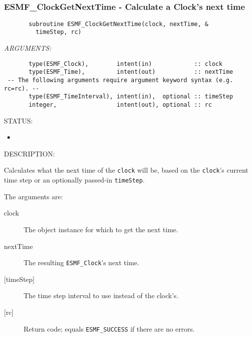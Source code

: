  
\mbox{}\hrulefill\ 
 
\subsubsection [ESMF\_ClockGetNextTime] {ESMF\_ClockGetNextTime - Calculate a Clock's next time}


 
\begin{verbatim}       subroutine ESMF_ClockGetNextTime(clock, nextTime, &
         timeStep, rc)
 \end{verbatim}{\em ARGUMENTS:}
\begin{verbatim}       type(ESMF_Clock),        intent(in)            :: clock
       type(ESMF_Time),         intent(out)           :: nextTime
 -- The following arguments require argument keyword syntax (e.g. rc=rc). --
       type(ESMF_TimeInterval), intent(in),  optional :: timeStep
       integer,                 intent(out), optional :: rc
 \end{verbatim}
{\sf STATUS:}
   \begin{itemize}
   \item{}
   \end{itemize}
  
{\sf DESCRIPTION:\\ }


       Calculates what the next time of the {\tt clock} will be, based on
       the {\tt clock}'s current time step or an optionally passed-in
       {\tt timeStep}.
  
       The arguments are:
       \begin{description}
       \item[clock]
            The object instance for which to get the next time.
       \item[nextTime]
            The resulting {\tt ESMF\_Clock}'s next time.
       \item[{[timeStep]}]
            The time step interval to use instead of the clock's.
       \item[{[rc]}]
            Return code; equals {\tt ESMF\_SUCCESS} if there are no errors.
       \end{description}
   
 
\mbox{}\hrulefill\ 
 
